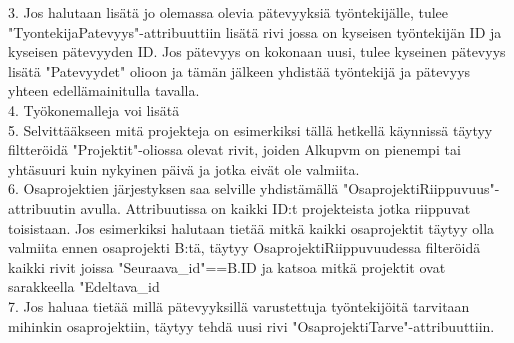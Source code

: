 \documentclass{article}
\begin{document}
3. Jos halutaan lisätä jo olemassa olevia pätevyyksiä työntekijälle, tulee "TyontekijaPatevyys"-attribuuttiin lisätä rivi jossa on kyseisen työntekijän ID ja kyseisen pätevyyden ID. Jos pätevyys on kokonaan uusi, tulee kyseinen pätevyys lisätä "Patevyydet" olioon ja tämän jälkeen yhdistää työntekijä ja pätevyys yhteen edellämainitulla tavalla.
\\


4. Työkonemalleja voi lisätä 
\\

5. Selvittääkseen mitä projekteja on esimerkiksi tällä hetkellä käynnissä  täytyy filtteröidä "Projektit"-oliossa olevat rivit, joiden Alkupvm on pienempi tai yhtäsuuri kuin nykyinen päivä ja jotka eivät ole valmiita. 
\\

6. Osaprojektien järjestyksen saa selville yhdistämällä "OsaprojektiRiippuvuus"-attribuutin avulla. Attribuutissa on kaikki ID:t projekteista jotka riippuvat toisistaan. Jos esimerkiksi halutaan tietää mitkä kaikki osaprojektit täytyy olla valmiita ennen osaprojekti B:tä, täytyy OsaprojektiRiippuvuudessa filteröidä kaikki rivit joissa "Seuraava\_id"==B.ID ja katsoa mitkä projektit ovat sarakkeella "Edeltava\_id
\\

7. Jos haluaa tietää millä pätevyyksillä varustettuja työntekijöitä tarvitaan mihinkin osaprojektiin, täytyy tehdä uusi rivi "OsaprojektiTarve"-attribuuttiin. 


\end{document}
